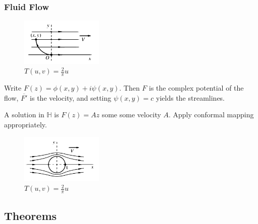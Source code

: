 \documentclass{article}
\begin{document}
\subsubsection{Fluid Flow}


\begin{figure}
\centering
\includegraphics[width=0.35\textwidth]{fluid.png}
\caption{$T(u,v) = \frac{2}{\pi}u$}
\end{figure}
Write $F(z) = \phi(x,y) + i\psi(x,y)$. Then $F$ is the complex potential of the flow, $\overline{F'}$ is the velocity, and setting $\psi(x,y) = c$ yields the streamlines.

A solution in $\mathbb{H}$ is $F(z) = Az$ some some velocity $A$. Apply conformal mapping appropriately.



\begin{figure}
\centering
\includegraphics[width=0.35\textwidth]{fluid-cylinder.png}
\caption{$T(u,v) = \frac{2}{\pi}u$}
\end{figure}

\newpage
\subsection{Theorems}
\end{document}

